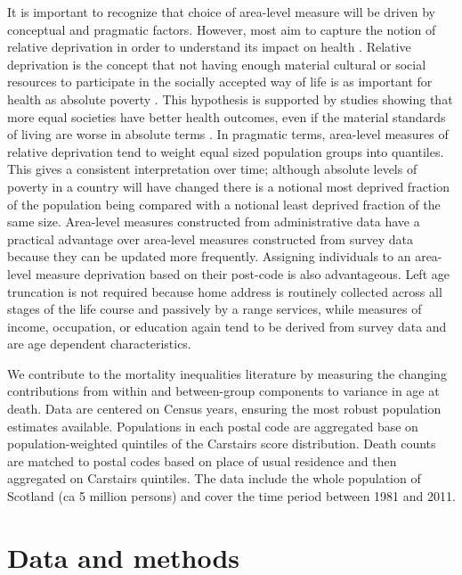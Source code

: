 \documentclass[12pt,oneside,a4paper]{article} %
\theoremstyle{definition}
\begin{document}
It is important to recognize that choice of area-level measure will be driven by conceptual and pragmatic factors. However, most aim to capture the notion of relative deprivation in order to understand its impact on health \citep{kearns2000,Morgan2006}. Relative deprivation is the concept that not having enough material cultural
or social resources to participate in the socially accepted way of life is as important for health as absolute poverty \citep{Townsend1987,Carstairs1989,Kearns2000,Kawachi2002}. This hypothesis is supported by studies showing that more equal societies have better health outcomes, even if the material standards of living are worse in absolute terms \citep{Wilkinson1997,Marmot2001,Wilkinson2007}. In pragmatic terms, area-level measures of relative deprivation tend to weight equal sized population groups into quantiles. This gives a
consistent interpretation over time; although
absolute levels of poverty in a country will have changed there is a notional
most deprived fraction of the population being compared with a notional least deprived fraction of the same size. 
Area-level measures constructed from administrative data have a practical advantage over area-level measures constructed from survey data because they can be updated more frequently. Assigning individuals to an area-level measure deprivation based on their post-code is also advantageous. Left age truncation is not required because home
address is routinely collected across all stages of the life course and
passively by a range services, while measures of income, occupation,
or education again tend to be derived from survey data and are age dependent characteristics.

We contribute to the mortality inequalities literature by measuring the changing contributions from within and
between-group components to variance in age at death. Data are centered on
Census years, ensuring the most robust population estimates available.
Populations in each postal code are aggregated base on population-weighted
quintiles of the Carstairs score distribution. Death counts are
matched to postal codes based on place of usual residence and then aggregated
on Carstairs quintiles. The data include the whole population of Scotland (ca 5
million persons) and cover the time period between 1981 and 2011.

\section{Data and methods}
\end{document}
